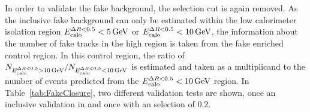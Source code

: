 In order to validate the fake background, the \nhits selection cut is again removed.
As the inclusive fake background can only be estimated within the low calorimeter isolation region $E^{\Delta R<0.5}_{\text{calo}}<5\,\text{Ge}\kern-0.06667em\text{V}$ or $E^{\Delta R<0.5}_{\text{calo}}<10\,\text{Ge}\kern-0.06667em\text{V}$, 
the information about the number of fake tracks in the high \ecalo region is taken from the fake enriched control region.
In this control region, the ratio of $N_{E^{\Delta R<0.5}_{\text{calo}}>10\,\text{Ge}\kern-0.06667em\text{V}}/N_{E^{\Delta R<0.5}_{\text{calo}}<10\,\text{Ge}\kern-0.06667em\text{V}}$ is estimated and taken as a multiplicand to the number of events predicted from the $E^{\Delta R<0.5}_{\text{calo}}<10\,\text{Ge}\kern-0.06667em\text{V}$ region.
In Table~\ref{tab:FakeClosure}, two different validation tests are shown, once an inclusive validation in \ias and once with an \ias selection of 0.2.
\renewcommand{\arraystretch}{1.5}
\begin{table}[!h]
\centering
\caption{Validation test of fake and leptonic background estimation methods (only statistical uncertainties are included). Left: $\ecalo>10\gev$ . Right: $\ecalo>10\gev$ and $\ias>0.2$}
\label{tab:FakeClosure}
\end{table}
